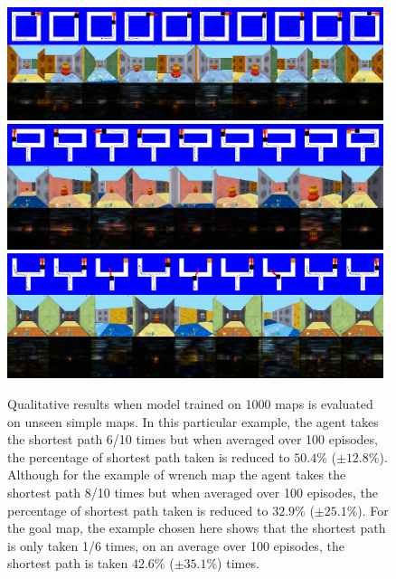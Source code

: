 \begin{figure}[h]
\def\vertspace{1ex}
%
\includegraphics[width=0.98\textwidth,trim=0 672pt 0 0,clip]{./exp-results/training-1000_on_square_map.png}%
\vspace{\vertspace}
%
\includegraphics[width=0.98\textwidth,trim=0 672pt 0 0,clip]{./exp-results/training-1000_on_wrench_map.png}%
\vspace{\vertspace}
%
\includegraphics[width=0.98\textwidth,trim=0 672pt 0 0,clip]{./exp-results/training-1000_on_goal_map.png}%
\caption{Qualitative results when model trained on 1000 maps is
  evaluated on unseen simple maps.
  In this particular example, the agent takes the shortest path 6/10 times but when averaged over 100 episodes, the percentage of shortest path taken is reduced to $50.4$\% ($\pm 12.8$\%).
  Although for the example of wrench map the agent takes the shortest path 8/10 times but when averaged over 100 episodes, the percentage of shortest path taken is reduced to $32.9$\% ($\pm 25.1$\%).
 For the goal map, the example chosen here shows that the shortest path is only taken 1/6 times, on an average over 100 episodes, the shortest path is taken $42.6$\% ($\pm 35.1$\%) times.
}
\label{fig:planning-qualitative}
\end{figure}

